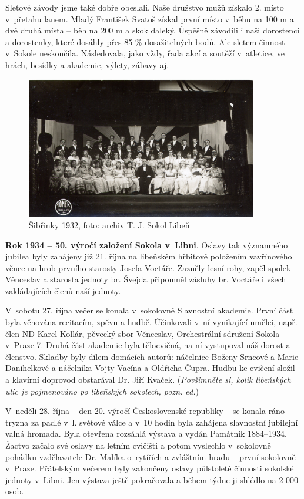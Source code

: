 \documentclass[a5paper, 11pt, twoside]{article}
\begin{document}
Sletové závody jsme také dobře obeslali. Naše družstvo mužů získalo 2.
místo v~přetahu lanem. Mladý František Svatoš získal první místo v~běhu
na 100 m a dvě druhá místa -- běh na 200 m a skok daleký. Úspěšně
závodili i naši dorostenci a dorostenky, které dosáhly přes 85 \%
dosažitelných bodů. Ale sletem činnost v~Sokole neskončila. Následovala,
jako vždy, řada akcí a soutěží v~atletice, ve hrách, besídky a akademie,
výlety, zábavy aj.

\begin{figure}[h!]
  \centering 
  \includegraphics[width=0.9\textwidth]{img/30_sibrinky.jpg}
  \caption*{Šibřinky 1932, foto: archiv T. J. Sokol Libeň}
\end{figure}

\textbf{Rok 1934 -- 50. výročí založení Sokola v~Libni}. Oslavy tak významného jubilea byly zahájeny již 21. října na libeňském
hřbitově položením vavřínového věnce na hrob prvního starosty Josefa
Voctáře. Zazněly lesní rohy, zapěl spolek Věnceslav a starosta jednoty
br. Švejda připomněl zásluhy br. Voctáře i všech zakládajících členů
naší jednoty.

V~sobotu 27. října večer se konala v~sokolovně Slavnostní akademie.
První část byla věnována recitacím, zpěvu a hudbě. Účinkovali v~ní
vynikající umělci, např. člen ND Karel Kollár, pěvecký sbor Věnceslav,
Orchestrální sdružení Sokola v~Praze 7. Druhá část akademie byla
tělocvičná, na ní vystupoval náš dorost a členstvo. Skladby byly dílem
domácích autorů: náčelnice Boženy Srncové a Marie Danihelkové a
náčelníka Vojty Vacína a Oldřicha Čupra. Hudbu ke cvičení složil a
klavírní doprovod obstarával Dr. Jiří Kvaček. (\textit{Povšimněte si,
kolik libeňských ulic je pojmenováno po libeňských sokolech, pozn. ed.})

V~neděli 28. října -- den 20. výročí Československé republiky -- se
konala ráno tryzna za padlé v~l. světové válce a v~10 hodin byla
zahájena slavnostní jubilejní valná hromada. Byla otevřena rozsáhlá
výstava a vydán Památník 1884--1934. Žactvo začalo své oslavy
na letním cvičišti a potom vyslechlo v~sokolovně pohádku vzdělavatele
Dr. Malíka o~rytířích a zvláštním hradu -- první sokolovně v~Praze.
Přátelským večerem byly zakončeny oslavy půlstoleté činnosti sokolské
jednoty v~Libni. Jen výstava ještě pokračovala a během týdne ji shlédlo
na 2 000 osob.
\end{document}
